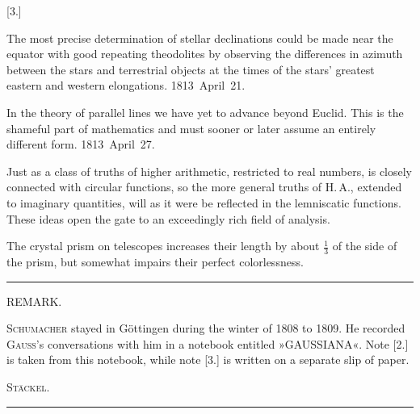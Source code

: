 \bigskip
{}
\centerline{[3.]}

\smallskip

\centerline{}

\smallskip

The most precise determination of stellar declinations could be made near the equator with good repeating theodolites by observing the differences in azimuth between the stars and terrestrial objects at the times of the stars' greatest eastern and western elongations. \hfill\mbox{1813 April 21.}

\smallskip

In the theory of parallel lines we have yet to advance beyond Euclid. This is the shameful part of mathematics and must sooner or later assume an entirely different form. \hfill\mbox{1813 April 27.}

\smallskip

Just as a class of truths of higher arithmetic, restricted to real numbers, is closely connected with circular functions, so the more general truths of H.\,A., extended to imaginary quantities, will as it were be reflected in the lemniscatic functions. These ideas open the gate to an exceedingly rich field of analysis.

\smallskip

The crystal prism on telescopes increases their length by about $\frac{1}{3}$
 of the side of the prism, but somewhat impairs their perfect colorlessness.

\bigskip
\hrule
\bigskip

\centerline{REMARK.}

\smallskip

\textsc{Schumacher} stayed in Göttingen during the winter of 1808 to 1809. He recorded \textsc{Gauss}'s conversations with him in a notebook entitled »GAUSSIANA«. Note [2.] is taken from this notebook, while note [3.] is written on a separate slip of paper.
\begin{flushright}\textsc{Stäckel}.\end{flushright}

\bigskip
\hrule
